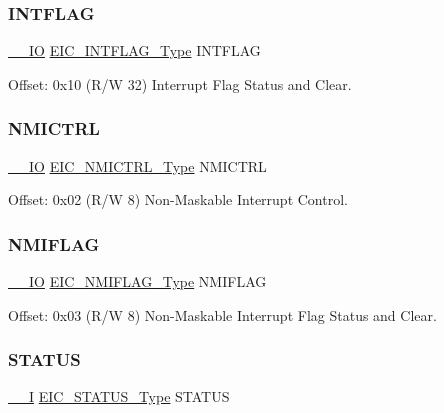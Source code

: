 \subsubsection{\texorpdfstring{INTFLAG}{INTFLAG}}
{\footnotesize\ttfamily \mbox{\hyperlink{core__cm0plus_8h_aec43007d9998a0a0e01faede4133d6be}{\+\_\+\+\_\+\+IO}} \mbox{\hyperlink{union_e_i_c___i_n_t_f_l_a_g___type}{E\+I\+C\+\_\+\+I\+N\+T\+F\+L\+A\+G\+\_\+\+Type}} I\+N\+T\+F\+L\+AG}



Offset\+: 0x10 (R/W 32) Interrupt Flag Status and Clear. 

\mbox{\label{struct_eic_a6c2af75a17a20061bd5b4563fb0ae083}} 
\subsubsection{\texorpdfstring{NMICTRL}{NMICTRL}}
{\footnotesize\ttfamily \mbox{\hyperlink{core__cm0plus_8h_aec43007d9998a0a0e01faede4133d6be}{\+\_\+\+\_\+\+IO}} \mbox{\hyperlink{union_e_i_c___n_m_i_c_t_r_l___type}{E\+I\+C\+\_\+\+N\+M\+I\+C\+T\+R\+L\+\_\+\+Type}} N\+M\+I\+C\+T\+RL}



Offset\+: 0x02 (R/W 8) Non-\/\+Maskable Interrupt Control. 

\mbox{\label{struct_eic_ae46ec4ce22a99ebcc1e9c145eb709d08}} 
\subsubsection{\texorpdfstring{NMIFLAG}{NMIFLAG}}
{\footnotesize\ttfamily \mbox{\hyperlink{core__cm0plus_8h_aec43007d9998a0a0e01faede4133d6be}{\+\_\+\+\_\+\+IO}} \mbox{\hyperlink{union_e_i_c___n_m_i_f_l_a_g___type}{E\+I\+C\+\_\+\+N\+M\+I\+F\+L\+A\+G\+\_\+\+Type}} N\+M\+I\+F\+L\+AG}



Offset\+: 0x03 (R/W 8) Non-\/\+Maskable Interrupt Flag Status and Clear. 

\mbox{\label{struct_eic_a6dae0aa228e8159f984922f8242f6615}} 
\subsubsection{\texorpdfstring{STATUS}{STATUS}}
{\footnotesize\ttfamily \mbox{\hyperlink{core__cm0plus_8h_af63697ed9952cc71e1225efe205f6cd3}{\+\_\+\+\_\+I}} \mbox{\hyperlink{union_e_i_c___s_t_a_t_u_s___type}{E\+I\+C\+\_\+\+S\+T\+A\+T\+U\+S\+\_\+\+Type}} S\+T\+A\+T\+US}



